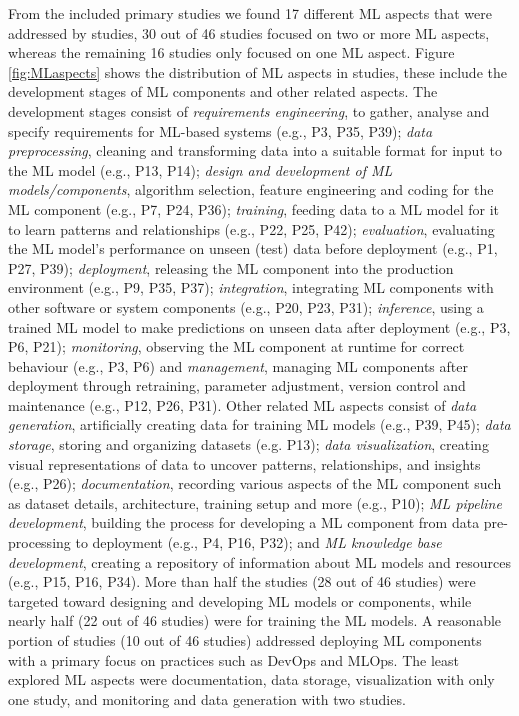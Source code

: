 From the included primary studies we found 17 different ML aspects that were addressed by studies, 30 out of 46 studies focused on two or more ML aspects, whereas the remaining 16 studies only focused on one ML aspect. Figure \ref{fig:MLaspects} shows the distribution of ML aspects in studies, these include the development stages of ML components and other related aspects. The development stages consist of \textit{requirements engineering}, to gather, analyse and specify requirements for ML-based systems (e.g., P3, P35, P39); \textit{data preprocessing}, cleaning and transforming data into a suitable format for input to the ML model (e.g., P13, P14); \textit{design and development of ML models/components}, algorithm selection, feature engineering and coding for the ML component (e.g., P7, P24, P36);  \textit{training}, feeding data to a ML model for it to learn patterns and relationships (e.g., P22, P25, P42); \textit{evaluation}, evaluating the ML model's performance on unseen (test) data before deployment (e.g., P1, P27, P39); \textit{deployment}, releasing the ML component into the production environment (e.g., P9, P35, P37); \textit{integration}, integrating ML components with other software or system components (e.g., P20, P23, P31); \textit{inference}, using a trained ML model to make predictions on unseen data after deployment (e.g., P3, P6, P21); \textit{monitoring}, observing the ML component at runtime for correct behaviour (e.g., P3, P6) and \textit{management}, managing ML components after deployment through retraining, parameter adjustment, version control and maintenance (e.g., P12, P26, P31). Other related ML aspects consist of  \textit{data generation}, artificially creating data for training ML models (e.g., P39, P45); \textit{data storage}, storing and organizing datasets (e.g. P13); \textit{data visualization}, creating visual representations of data to uncover patterns, relationships, and insights (e.g., P26); \textit{documentation}, recording various aspects of the ML component such as dataset details, architecture, training setup and more (e.g., P10); \textit{ML pipeline development}, building the process for developing a ML component from data pre-processing to deployment (e.g., P4, P16, P32); and \textit{ML knowledge base development}, creating a repository of information about ML models and resources (e.g., P15, P16, P34). More than half the studies (28 out of 46 studies) were targeted toward designing and developing ML models or components, while nearly half (22 out of 46 studies) were for training the ML models. A reasonable portion of studies (10 out of 46 studies) addressed deploying ML components with a primary focus on practices such as DevOps and MLOps. The least explored ML aspects were documentation, data storage, visualization with only one study, and monitoring and data generation with two studies.

